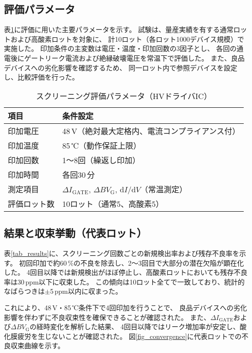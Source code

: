 \documentclass[twocolumn]{ieeetran}
\begin{document}
\subsection{評価パラメータ}

表\ref{tab_param}に評価に用いた主要パラメータを示す。
試験は、量産実績を有する通常ロットおよび高酸素ロットを対象に、
計10ロット（各ロット1000デバイス規模）で実施した。
印加条件の主変数は電圧・温度・印加回数の3因子とし、
各回の通電後にゲートリーク電流および絶縁破壊電圧を常温下で評価した。
また、良品デバイスへの劣化影響を確認するため、
同一ロット内で参照デバイスを設定し、比較評価を行った。

\begin{table}[t]
\centering
\caption{スクリーニング評価パラメータ（HVドライバIC）}
\label{tab_param}
\begin{tabular}{ll}
\toprule
項目 & 条件設定 \\
\midrule
印加電圧 & 48\,V（絶対最大定格内、電流コンプライアンス付） \\
印加温度 & 85\,℃（動作保証上限） \\
印加回数 & 1～8回（繰返し印加） \\
印加時間 & 各回30\,分 \\
測定項目 & $\Delta I_\mathrm{GATE}$, $\Delta BV_\mathrm{G}$, d$I$/d$V$（常温測定） \\
評価ロット数 & 10ロット（通常5、高酸素5） \\
\bottomrule
\end{tabular}
\end{table}

\subsection{結果と収束挙動（代表ロット）}

表\ref{tab_results}に、スクリーニング回数ごとの新規検出率および残存不良率を示す。
初回印加で約60\,\%の不良を除去し、2～3回目で大部分の潜在欠陥が顕在化した。
4回目以降では新規検出がほぼ停止し、高酸素ロットにおいても残存不良率は30\,ppm以下に収束した。
この傾向は10ロット全てで一致しており、統計的なばらつきは$\pm$5\,ppm以内に収まった。

これにより、48\,V・85\,℃条件下で4回印加を行うことで、
良品デバイスへの劣化影響を伴わずに不良収束性を確保できることが確認された。
また、$\Delta I_\mathrm{GATE}$および$\Delta BV_\mathrm{G}$の経時変化を解析した結果、
4回目以降ではリーク増加率が安定し、酸化膜疲労を生じないことが確認された。
図\ref{fig_convergence}に代表ロットでの不良収束曲線を示す。
\end{document}
